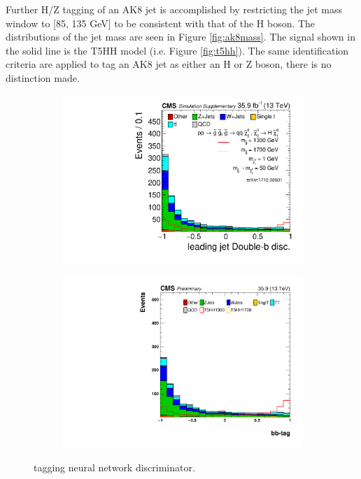 Further H/Z tagging of an AK8 jet is accomplished by restricting the jet mass window to [85, 135 GeV] to be consistent with that of the H boson. The distributions of the jet mass are seen in Figure \ref{fig:ak8mass}. The signal shown in the solid line is the T5HH model (i.e. Figure \ref{fig:t5hh}). The same identification criteria are applied to tag an AK8 jet as either an H or Z boson, there is no distinction made.

\begin{figure}[htbp]
\begin{subfigure}[b]{0.5\textwidth}
\centering
\includegraphics[width=\textwidth]{figs/SUS17006/J1BB_LooseJetMass.pdf}
\end{subfigure}
\begin{subfigure}[b]{0.5\textwidth}
\centering
\includegraphics[width=\textwidth]{figs/SUS17006/J2pt_BBtag_baseline.pdf} 
\end{subfigure}
\caption{\bbbar tagging neural network discriminator.}
\label{fig:ak8bb}
\end{figure}

